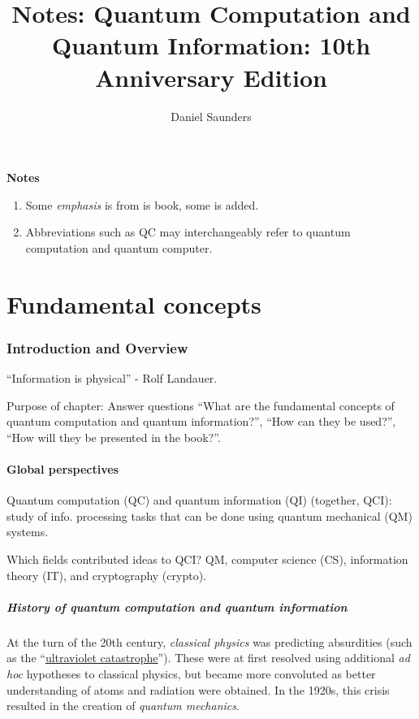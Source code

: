 \documentclass{article}
\title{Notes: Quantum Computation and Quantum Information: 10th Anniversary Edition}
\author{Daniel Saunders}
\begin{document}
\maketitle

\textbf{Notes}

\begin{enumerate}
	\item Some \textit{emphasis} is from is book, some is added.
	\item Abbreviations such as QC may interchangeably refer to quantum computation and quantum computer.
\end{enumerate}

\part{Fundamental concepts}

\section{Introduction and Overview}

``Information is physical'' - Rolf Landauer.

Purpose of chapter: Answer questions ``What are the fundamental concepts of quantum computation and quantum information?'', ``How can they be used?'', ``How will they be presented in the book?''.

\subsection{Global perspectives}

Quantum computation (QC) and quantum information (QI) (together, QCI): study of info. processing tasks that can be done using quantum mechanical (QM) systems.

Which fields contributed ideas to QCI? QM, computer science (CS), information theory (IT), and cryptography (crypto).

\subsubsection{History of quantum computation and quantum information}

At the turn of the 20th century, \textit{classical physics} was predicting absurdities (such as the ``\href{https://en.wikipedia.org/wiki/Ultraviolet_catastrophe}{ultraviolet catastrophe}''). These were at first resolved using additional \textit{ad hoc} hypotheses to classical physics, but became more convoluted as better understanding of atoms and radiation were obtained. In the 1920s, this crisis resulted in the creation of \textit{quantum mechanics}.
\end{document}
